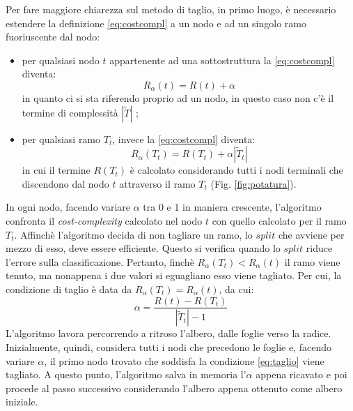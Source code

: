 Per fare maggiore chiarezza sul metodo di taglio, in primo luogo, è necessario estendere la definizione \ref{eq:costcompl} a un nodo e ad un singolo ramo fuoriuscente dal nodo:
\begin{itemize}
    \item per qualsiasi nodo $t$ appartenente ad una sottostruttura la \ref{eq:costcompl} diventa: $$R_{\alpha}(t)=R(t)+\alpha$$in quanto ci si sta riferendo proprio ad un nodo, in questo caso non c'è il termine di complessità $|\tilde{T}|$ ;  
    \item per qualsiasi ramo $T_{t}$, invece la \ref{eq:costcompl} diventa: $$R_{\alpha}\left(T_{t}\right)=R\left(T_{t}\right)+\alpha\left|\tilde{T}_{t}\right|$$ in cui il termine $R\left(T_{t}\right)$ è calcolato considerando tutti i nodi terminali che discendono dal nodo $t$ attraverso il ramo $T_{t}$ (Fig. \ref{fig:potatura}).
\end{itemize}
In ogni nodo, facendo variare $\alpha$ tra 0 e 1 in maniera crescente, l'algoritmo confronta il \textit{cost-complexity} calcolato nel nodo $t$ con quello calcolato per il ramo $T_{t}$. Affinchè l'algoritmo decida di non tagliare un ramo, lo $split$ che avviene per mezzo di esso, deve essere efficiente. Questo si verifica quando lo $split$ riduce l'errore sulla classificazione. Pertanto, finchè $R_{\alpha}\left(T_{t}\right)<R_{\alpha}(t)$ il ramo viene tenuto, ma nonappena i due valori si eguagliano esso viene tagliato. Per cui, la condizione di taglio è data da $R_{\alpha}\left(T_{t}\right)=R_{\alpha}(t)$, da cui:
\begin{equation}
\alpha=\frac{R(t)-R\left(T_{t}\right)}{\left|\tilde{T}_{t}\right|-1}
\label{eq:taglio}
\end{equation}
L'algoritmo lavora percorrendo a ritroso l'albero, dalle foglie verso la radice.\\ Inizialmente, quindi, considera tutti i nodi che precedono le foglie e, facendo variare $\alpha$, il primo nodo trovato che soddisfa la condizione \ref{eq:taglio} viene tagliato. A questo punto, l'algoritmo salva in memoria l'$\alpha$ appena ricavato e poi procede al passo successivo considerando l'albero appena ottenuto come albero iniziale. 
